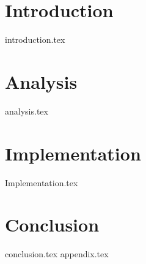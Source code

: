 \documentclass[
    nolot,
    color,   %
	table,   %
    twoside, %
]{fithesis/fithesis3}
\begin{document}
  \pagestyle{plain}
  
  \chapter{Introduction}
  {introduction.tex}
  \chapter{Analysis}
  {analysis.tex}
  \chapter{Implementation}
  {Implementation.tex}  
  \chapter{Conclusion}
  {conclusion.tex}
  {}
  {appendix.tex}
\end{document}
